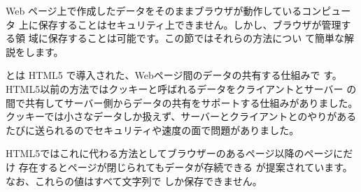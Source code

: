 Web ページ上で作成したデータをそのままブラウザが動作しているコンピュータ
上に保存することはセキュリティ上できません。しかし、ブラウザが管理する領
域に保存することは可能です。この節ではそれらの方法につい
て簡単な解説をします。

とは HTML5 で導入された、Webページ間のデータの共有する仕組みで
す。HTML5以前の方法ではクッキーと呼ばれるデータをクライアントとサーバー
の間で共有してサーバー側からデータの共有をサポートする仕組みがありました。
クッキーでは小さなデータしか扱えず、サーバーとクライアントとのやりがある
たびに送られるのでセキュリティや速度の面で問題がありました。

HTML5ではこれに代わる方法としてブラウザーのあるページ以降のページにだけ
存在するとページが閉じられてもデータが存続できる
が提案されています。なお、これらの値はすべて文字列で
しか保存できません。

